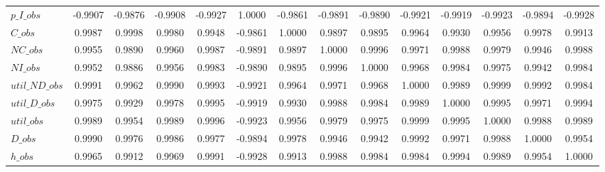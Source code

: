 \begin{center}
\begin{longtable}{lccccccccccccc}
$p\_I\_obs      $	 & 	          -0.9907	 & 	          -0.9876	 & 	          -0.9908	 & 	          -0.9927	 & 	           1.0000	 & 	          -0.9861	 & 	          -0.9891	 & 	          -0.9890	 & 	          -0.9921	 & 	          -0.9919	 & 	          -0.9923	 & 	          -0.9894	 & 	          -0.9928 \\ 
$C\_obs         $	 & 	           0.9987	 & 	           0.9998	 & 	           0.9980	 & 	           0.9948	 & 	          -0.9861	 & 	           1.0000	 & 	           0.9897	 & 	           0.9895	 & 	           0.9964	 & 	           0.9930	 & 	           0.9956	 & 	           0.9978	 & 	           0.9913 \\ 
$NC\_obs        $	 & 	           0.9955	 & 	           0.9890	 & 	           0.9960	 & 	           0.9987	 & 	          -0.9891	 & 	           0.9897	 & 	           1.0000	 & 	           0.9996	 & 	           0.9971	 & 	           0.9988	 & 	           0.9979	 & 	           0.9946	 & 	           0.9988 \\ 
$NI\_obs        $	 & 	           0.9952	 & 	           0.9886	 & 	           0.9956	 & 	           0.9983	 & 	          -0.9890	 & 	           0.9895	 & 	           0.9996	 & 	           1.0000	 & 	           0.9968	 & 	           0.9984	 & 	           0.9975	 & 	           0.9942	 & 	           0.9984 \\ 
$util\_ND\_obs  $	 & 	           0.9991	 & 	           0.9962	 & 	           0.9990	 & 	           0.9993	 & 	          -0.9921	 & 	           0.9964	 & 	           0.9971	 & 	           0.9968	 & 	           1.0000	 & 	           0.9989	 & 	           0.9999	 & 	           0.9992	 & 	           0.9984 \\ 
$util\_D\_obs   $	 & 	           0.9975	 & 	           0.9929	 & 	           0.9978	 & 	           0.9995	 & 	          -0.9919	 & 	           0.9930	 & 	           0.9988	 & 	           0.9984	 & 	           0.9989	 & 	           1.0000	 & 	           0.9995	 & 	           0.9971	 & 	           0.9994 \\ 
$util\_obs      $	 & 	           0.9989	 & 	           0.9954	 & 	           0.9989	 & 	           0.9996	 & 	          -0.9923	 & 	           0.9956	 & 	           0.9979	 & 	           0.9975	 & 	           0.9999	 & 	           0.9995	 & 	           1.0000	 & 	           0.9988	 & 	           0.9989 \\ 
$D\_obs         $	 & 	           0.9990	 & 	           0.9976	 & 	           0.9986	 & 	           0.9977	 & 	          -0.9894	 & 	           0.9978	 & 	           0.9946	 & 	           0.9942	 & 	           0.9992	 & 	           0.9971	 & 	           0.9988	 & 	           1.0000	 & 	           0.9954 \\ 
$h\_obs         $	 & 	           0.9965	 & 	           0.9912	 & 	           0.9969	 & 	           0.9991	 & 	          -0.9928	 & 	           0.9913	 & 	           0.9988	 & 	           0.9984	 & 	           0.9984	 & 	           0.9994	 & 	           0.9989	 & 	           0.9954	 & 	           1.0000 \\ 
\end{longtable}
 \end{center}
